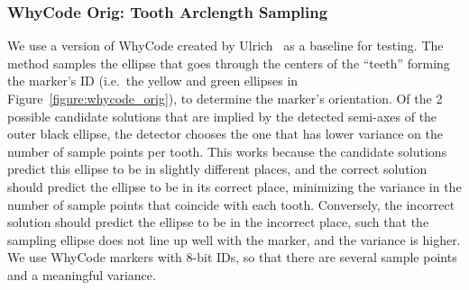 \subsubsection{WhyCode Orig: Tooth Arclength Sampling}
\label{section:whycode_orig}
We use a version of WhyCode created by Ulrich~\cite{ulrich} as a baseline for testing.
The method samples the ellipse that goes through the centers of the ``teeth'' forming the marker's ID
(i.e.~the yellow and green ellipses in Figure~\ref{figure:whycode_orig}),
to determine the marker's orientation.
Of the 2 possible candidate solutions that are implied by the detected semi-axes of the outer black ellipse, the detector chooses the one that has lower variance on the number of sample points per tooth.
This works because the candidate solutions predict this ellipse to be in slightly different places,
and the correct solution should predict the ellipse to be in its correct place,
minimizing the variance in the number of sample points that coincide with each tooth.
Conversely, the incorrect solution should predict the ellipse to be in the incorrect place,
such that the sampling ellipse does not line up well with the marker, and the variance is higher.
We use WhyCode markers with 8-bit IDs, so that there are several sample points and a meaningful variance.

